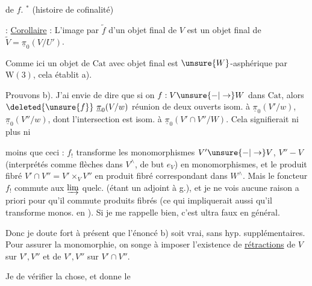 de $f$.    $^{*}$ (histoire de cofinalité)


 : \uline{Corollaire} : L'image par $\widetilde f$ d'un objet final de $V$ est un objet final de $\widetilde V=\underline{\pi}_0(V/U')$.

Comme ici un objet de $\mathrm{Cat}$ avec objet final est $\unsure{W}$-asphérique par $\mathrm W(3)$, cela établit a).

Prouvons b). J'ai envie de dire que si on  $f:V\unsure{-|\to}W$ dans $\mathrm{Cat}$, alors $\deleted{\unsure{f}}\ \underline{\pi}_0(V/w)$  réunion de deux ouverts isom. à $\underline{\pi}_0(V'/w)$, $\underline{\pi}_0(V''/w)$, dont l'intersection est isom. à $\underline{\pi}_0(V'\cap V''/W)$. Cela signifierait ni plus ni

moins que ceci : $f_!$ transforme les monomorphismes $V'\unsure{-|\to}V$, $V''\mathbin{-}V$ (interprétés comme flèches dans $V^\wedge$, de but $e_V$) en monomorphismes, et le produit fibré $V'\cap V''=V'\times_V V''$ en  produit fibré correspondant dans $W^\wedge$. Mais le foncteur $f_!$ commute aux $\varinjlim$ quelc. (étant un adjoint à g.), et je ne vois aucune raison a priori pour qu'il  commute   produits fibrés (ce qui impliquerait aussi qu'il transforme monos. en ). Si je me rappelle bien, c'est ultra faux en général.

Donc je doute fort à présent que l'énoncé b) soit vrai, sans hyp. supplémentaires. Pour assurer la monomorphie, on songe à imposer l'existence de \uline{rétractions} de $V$ sur $V',V''$ et de $V',V''$ sur $V'\cap V''$.

Je  de vérifier la chose, et donne le

